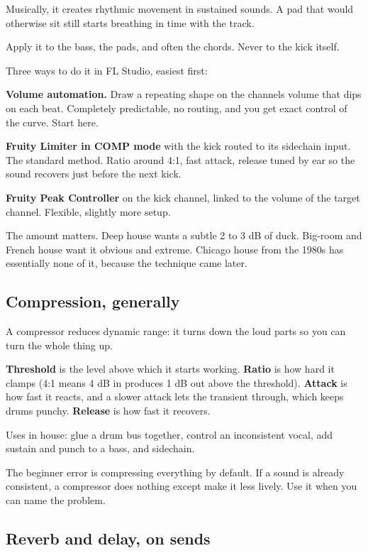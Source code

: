 Musically, it creates rhythmic movement in sustained sounds. A pad that would otherwise sit
still starts breathing in time with the track.

Apply it to the bass, the pads, and often the chords. Never to the kick itself.

Three ways to do it in FL Studio, easiest first:

\textbf{Volume automation.} Draw a repeating shape on the channel\textquotesingle s volume that dips on each
beat. Completely predictable, no routing, and you get exact control of the curve. Start
here.

\textbf{Fruity Limiter in COMP mode} with the kick routed to its sidechain input. The standard
method. Ratio around 4:1, fast attack, release tuned by ear so the sound recovers just
before the next kick.

\textbf{Fruity Peak Controller} on the kick channel, linked to the volume of the target channel.
Flexible, slightly more setup.

The amount matters. Deep house wants a subtle 2 to 3 dB of duck. Big-room and French house
want it obvious and extreme. Chicago house from the 1980s has essentially none of it,
because the technique came later.

\subsection{Compression, generally}\label{th07_mixing-compression-generally}

A compressor reduces dynamic range: it turns down the loud parts so you can turn the whole
thing up.

\textbf{Threshold} is the level above which it starts working. \textbf{Ratio} is how hard it clamps
(4:1 means 4 dB in produces 1 dB out above the threshold). \textbf{Attack} is how fast it reacts,
and a slower attack lets the transient through, which keeps drums punchy. \textbf{Release} is how
fast it recovers.

Uses in house: glue a drum bus together, control an inconsistent vocal, add sustain and
punch to a bass, and sidechain.

The beginner error is compressing everything by default. If a sound is already consistent, a
compressor does nothing except make it less lively. Use it when you can name the problem.

\subsection{Reverb and delay, on sends}\label{th07_mixing-reverb-and-delay-on-sends}

